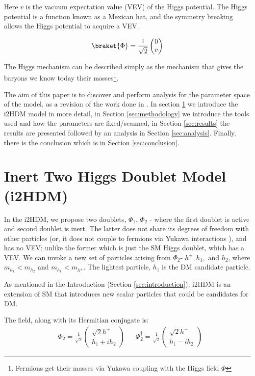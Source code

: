 \documentclass[12pt]{article}
\begin{document}
Here $v$ is the vacuum expectation value (VEV) of the Higgs potential. The Higgs potential is a function known as a Mexican hat, and the symmetry breaking allows the Higgs potential to acquire a VEV.

\begin{equation}
    \braket{\Phi} = \frac{1}{\sqrt{2}}
    \begin{pmatrix}
        0\\
        v
    \end{pmatrix}
\end{equation}

The Higgs mechanism can be described simply as the mechanism that gives the baryons we know today their masses\footnote{Fermions get their masses via Yukawa coupling with the Higgs field $\Phi$}.

The aim of this paper is to discover and perform analysis for the parameter space of the model, as a revision of the work done in \cite{Belyaev:2016lok}. In section \ref{sec:i2HDM} we introduce the i2HDM model in more detail, in Section \ref{sec:methodology} we introduce the tools used and how the parameters are fixed/scanned, in Section \ref{sec:results} the results are presented followed by an analysis in Section \ref{sec:analysis}. Finally, there is the conclusion which is in Section \ref{sec:conclusion}.

\section{Inert Two Higgs Doublet Model (i2HDM)}
\label{sec:i2HDM}
In the i2HDM, we propose two doublets, $\Phi_1$, $\Phi_2$ - where the first doublet is active and second doublet is inert. The latter does not share its degrees of freedom with other particles (or, it does not couple to fermions via Yukawa interactions \cite{Belyaev_2022}), and has no VEV; unlike the former which is just the SM Higgs doublet, which has a VEV. We can invoke a new set of particles arising from $\Phi_2$- $h^\pm, h_1,$ and $h_2$, where $m_{h_1} < m_{h_2}$ and $m_{h_1} < m_{h^\pm}$. The lightest particle, $h_1$ is the DM candidate particle.

As mentioned in the Introduction (Section \ref{sec:introduction}), i2HDM is an extension of SM that introduces new scalar particles that could be candidates for DM.

The field, along with its Hermitian conjugate is:
\begin{align}
    &\Phi_2 = \frac{1}{\sqrt{2}}
        \begin{pmatrix}
            {\sqrt{2}h^+} \\
            {h_1 + ih_2 }
        \end{pmatrix}&
    &\Phi_2^\dagger = \frac{1}{\sqrt{2}} 
        \begin{pmatrix}
            {\sqrt{2}h^-} \\
            {h_1 - ih_2 }
        \end{pmatrix}
\end{align} 
\end{document}
